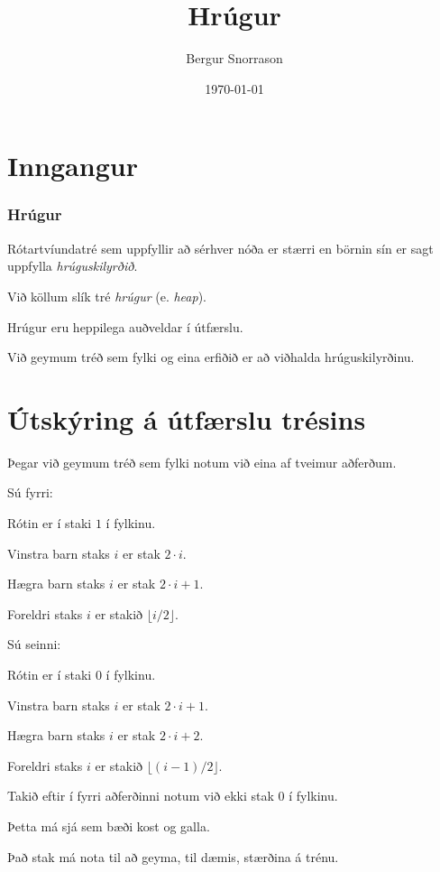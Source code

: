 \title{Hrúgur}
\author{Bergur Snorrason}
\date{\today}



\frame{\titlepage}

\section{Inngangur}
{
    \frametitle{Hrúgur}
    {
        \item<1-> Rótartvíundatré sem uppfyllir að sérhver nóða er stærri en börnin sín er sagt uppfylla \emph{hrúguskilyrðið}.
        \item<2-> Við köllum slík tré \emph{hrúgur} (e. \emph{heap}).
        \item<3-> Hrúgur eru heppilega auðveldar í útfærslu.
        \item<4-> Við geymum tréð sem fylki og eina erfiðið er að viðhalda hrúguskilyrðinu.
    }
}

\section{Útskýring á útfærslu trésins}
{
    {
        \item<1-> Þegar við geymum tréð sem fylki notum við eina af tveimur aðferðum.
        \item<2-> Sú fyrri:
        {
            \item<3-> Rótin er í staki $1$ í fylkinu.
            \item<4-> Vinstra barn staks $i$ er stak $2 \cdot i$.
            \item<5-> Hægra barn staks $i$ er stak $2 \cdot i + 1$.
            \item<6-> Foreldri staks $i$ er stakið $\lfloor i/2 \rfloor$.
        }
        \item<7-> Sú seinni:
        {
            \item<8-> Rótin er í staki $0$ í fylkinu.
            \item<9-> Vinstra barn staks $i$ er stak $2\cdot i + 1$.
            \item<10-> Hægra barn staks $i$ er stak $2\cdot i + 2$.
            \item<11-> Foreldri staks $i$ er stakið $\lfloor (i - 1)/2 \rfloor$.
        }
        \item<12-> Takið eftir í fyrri aðferðinni notum við ekki stak $0$ í fylkinu.
        \item<13-> Þetta má sjá sem bæði kost og galla.
        \item<14-> Það stak má nota til að geyma, til dæmis, stærðina á trénu.
    }
}

